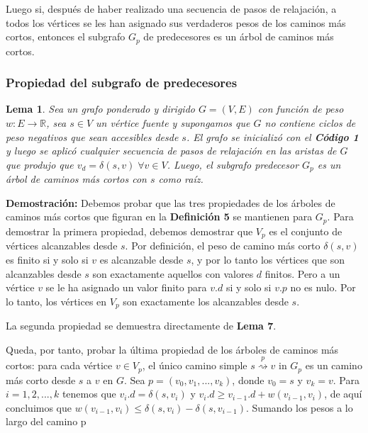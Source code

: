 \documentclass[12pt]{article}
\newcommand{\proof}{\textbf{Demostración:} }
\newcommand{\nl}{\vspace{0.3cm}}
\newtheorem{lemma}{Lema}
\begin{document}
\nl

Luego si, después de haber realizado una secuencia de pasos de relajación, a todos los vértices se les han asignado sus verdaderos pesos de los caminos más cortos, entonces el subgrafo $G_p$ de predecesores es un árbol de caminos más cortos.

\subsubsection{Propiedad del subgrafo de predecesores}

\begin{lemma}
	Sea un grafo ponderado y dirigido $G = (V, E)$ con función de peso $w: E \rightarrow \mathbb{R}$, sea $s \in V$ un vértice fuente y supongamos que $G$ no contiene ciclos de peso negativos que sean accesibles desde $s$. El grafo se inicializó con el \textbf{Código 1} y luego se aplicó cualquier secuencia de pasos de relajación en las aristas de $G$ que produjo que $v_d = \delta(s, v) \; \forall v \in V$. Luego, el subgrafo predecesor $G_p$ es un árbol de caminos más cortos con $s$ como raíz.
\end{lemma}

\proof Debemos probar que las tres propiedades de los árboles de caminos más cortos que figuran en la \textbf{Definición 5} se mantienen para $G_p$. Para demostrar la primera propiedad, debemos demostrar que $V_p$ es el conjunto de vértices alcanzables desde $s$. Por definición, el peso de camino más corto $\delta(s, v)$ es finito si y solo si $v$ es alcanzable desde $s$, y por lo tanto los vértices que son alcanzables desde $s$ son exactamente aquellos con valores $d$ finitos. Pero a un vértice $v$ se le ha asignado un valor finito para $v.d$ si y solo si $v.p$ no es nulo. Por lo tanto, los vértices en $V_p$ son exactamente los alcanzables desde $s$.

\nl

La segunda propiedad se demuestra directamente de \textbf{Lema 7}.

\nl

Queda, por tanto, probar la última propiedad de los árboles de caminos más cortos: para cada vértice $v \in V_p$, el único camino simple $ s \stackrel{p}{\rightsquigarrow} v $ in $G_p$ es un camino más corto desde $s$ a $v$ en $G$. Sea $p = (v_0, v_1, ..., v_k)$, donde $v_0 = s$ y $v_k = v$. Para $i = 1, 2, ..., k$ tenemos que $v_{i}.d = \delta(s, v_i)$ y $v_{i}.d \geqslant v_{i-1}.d + w(v_{i-1}, v_i)$, de aquí concluimos que $w(v_{i-1}, v_i) \leqslant \delta(s, v_i) - \delta(s, v_{i-1})$. Sumando los pesos a lo largo del camino p
\end{document}
